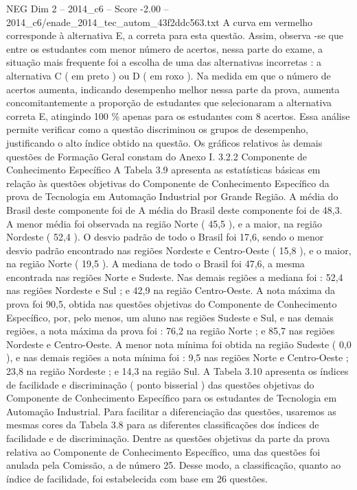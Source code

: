 \begin{textsample}{NEG Dim 2 – 2014\_c6 – Score -2.00 – 2014\_c6/enade\_2014\_tec\_autom\_43f2ddc563.txt}
A curva em vermelho corresponde à alternativa E, a correta para esta questão.
Assim, observa -se que entre os estudantes com menor número de acertos, nessa parte do exame, a situação mais frequente foi a escolha de uma das alternativas incorretas : a alternativa C ( em preto ) ou D ( em roxo ).
Na medida em que o número de acertos aumenta, indicando desempenho melhor nessa parte da prova, aumenta concomitantemente a proporção de estudantes que selecionaram a alternativa correta E, atingindo 100 \% apenas para os estudantes com 8 acertos.
Essa análise permite verificar como a questão discriminou os grupos de desempenho, justificando o alto índice obtido na questão.
Os gráficos relativos às demais questões de Formação Geral constam do Anexo I. 3.2.2 Componente de Conhecimento Específico A Tabela 3.9 apresenta as estatísticas básicas em relação às questões objetivas do Componente de Conhecimento Específico da prova de Tecnologia em Automação Industrial por Grande Região.
A média do Brasil deste componente foi de A média do Brasil deste componente foi de 48,3.
A menor média foi observada na região Norte ( 45,5 ), e a maior, na região Nordeste ( 52,4 ).
O desvio padrão de todo o Brasil foi 17,6, sendo o menor desvio padrão encontrado nas regiões Nordeste e Centro-Oeste ( 15,8 ), e o maior, na região Norte ( 19,5 ).
A mediana de todo o Brasil foi 47,6, a mesma encontrada nas regiões Norte e Sudeste.
Nas demais regiões a mediana foi : 52,4 nas regiões Nordeste e Sul ; e 42,9 na região Centro-Oeste.
A nota máxima da prova foi 90,5, obtida nas questões objetivas do Componente de Conhecimento Específico, por, pelo menos, um aluno nas regiões Sudeste e Sul, e nas demais regiões, a nota máxima da prova foi : 76,2 na região Norte ; e 85,7 nas regiões Nordeste e Centro-Oeste.
A menor nota mínima foi obtida na região Sudeste ( 0,0 ), e nas demais regiões a nota mínima foi : 9,5 nas regiões Norte e Centro-Oeste ; 23,8 na região Nordeste ; e 14,3 na região Sul.
A Tabela 3.10 apresenta os índices de facilidade e discriminação ( ponto bisserial ) das questões objetivas do Componente de Conhecimento Específico para os estudantes de Tecnologia em Automação Industrial.
Para facilitar a diferenciação das questões, usaremos as mesmas cores da Tabela 3.8 para as diferentes classificações dos índices de facilidade e de discriminação.
Dentre as questões objetivas da parte da prova relativa ao Componente de Conhecimento Específico, uma das questões foi anulada pela Comissão, a de número 25.
Desse modo, a classificação, quanto ao índice de facilidade, foi estabelecida com base em 26 questões.

\end{textsample}
